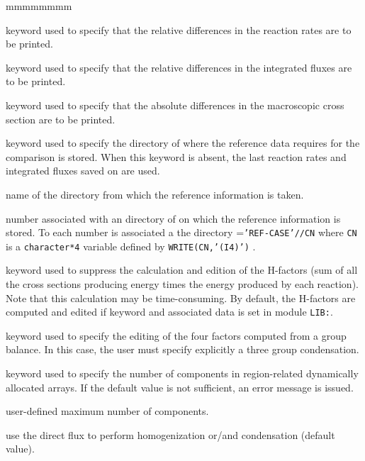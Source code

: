 \begin{ListeDeDescription}{mmmmmmmm}
\item[\moc{RATE}] keyword used to specify that the relative differences in the
reaction rates are to be printed.

\item[\moc{FLUX}] keyword used to specify that the relative differences in the
integrated fluxes are to be printed. 

\item[\moc{DELS}] keyword used to specify that the absolute differences in the
macroscopic cross section are to be printed.

\item[\moc{REFE}] keyword used to specify the directory of  where the
reference data requires for the comparison is stored. When this keyword is
absent, the last reaction rates and integrated fluxes saved on  are
used.

\item[\dusa{DIRO}] name of the directory from which the reference information
is taken.

\item[\dusa{idiro}] number associated with an directory of  on
which the reference information is  stored. To each number  is
associated a the directory  ={\tt 'REF-CASE'//CN} where {\tt CN} is a
{\tt character*4} variable defined by {\tt WRITE(CN,'(I4)')} . 

\item[\moc{NOHF}] keyword used to suppress the calculation and edition of the H-factors (sum of all
the cross sections producing energy times the energy produced by each reaction).
Note that this calculation may be time-consuming. By default, the H-factors are
computed and edited if keyword  and associated data is set in module {\tt LIB:}.

\item[\moc{NBAL}] keyword used to specify the editing of the four factors computed
from a group balance. In this case, the user must specify explicitly a three
group condensation.

\item[\moc{MAXR}] keyword used to specify the number of components in
region-related dynamically allocated arrays. If the default value is
not sufficient, an error message is issued.

\item[\dusa{maxpts}] user-defined maximum number of components.

\item[\moc{DIRE}] use the direct flux to perform homogenization or/and
condensation (default value).


\end{ListeDeDescription}
